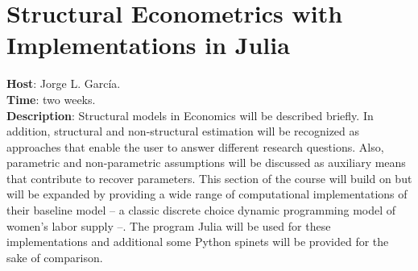 \section{Structural Econometrics with Implementations in Julia}
\noindent \textbf{Host}: Jorge L. Garc\'{i}a.\\
\noindent \textbf{Time}: two weeks.\\
\noindent \textbf{Description}:  Structural models in Economics will be described briefly. In addition, structural and non-structural estimation will be recognized as approaches that enable the user to answer different research questions. Also, parametric and non-parametric assumptions will be discussed as auxiliary means that contribute to recover parameters. This section of the course will build on \citet{keane2011structural} but will be expanded by providing a wide range of computational implementations of their baseline model – a classic discrete choice dynamic programming model of women's labor supply –. The program Julia will be used for these implementations and additional some Python spinets will be provided for the sake of comparison.

\clearpage


\clearpage

